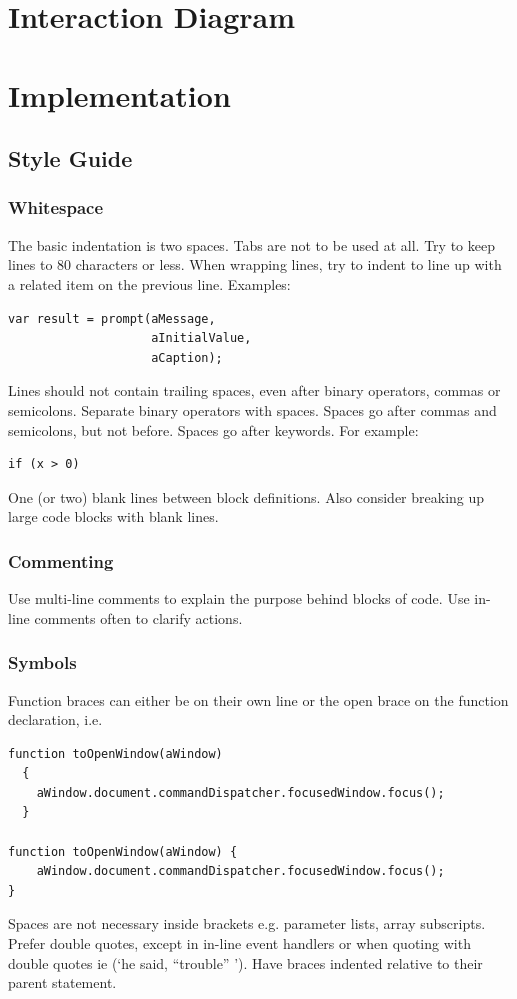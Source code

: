 \documentclass[letterpaper,12pt]{article}
\begin{document}
\section{Interaction Diagram}

\section{Implementation}
\subsection{Style Guide}
\subsubsection{Whitespace}
The basic indentation is two spaces. Tabs are not to be used at all.
Try to keep lines to 80 characters or less. When wrapping lines, try to indent to line up with a related item on the previous line. Examples: 
\begin{verbatim}
var result = prompt(aMessage,
                    aInitialValue,
                    aCaption);
\end{verbatim}
Lines should not contain trailing spaces, even after binary operators, commas or semicolons.
Separate binary operators with spaces.
Spaces go after commas and semicolons, but not before.
Spaces go after keywords. For example:
\begin{verbatim}
if (x > 0)
\end{verbatim}
One (or two) blank lines between block definitions. Also consider breaking up large code blocks with blank lines.

\subsubsection{Commenting}
Use multi-line comments to explain the purpose behind blocks of code.
Use in-line comments often to clarify actions.

\subsubsection{Symbols}
Function braces can either be on their own line or the open brace on the function declaration, i.e.

\begin{verbatim}
function toOpenWindow(aWindow)
  {
    aWindow.document.commandDispatcher.focusedWindow.focus();  
  }

function toOpenWindow(aWindow) {
    aWindow.document.commandDispatcher.focusedWindow.focus();  
}
\end{verbatim}
Spaces are not necessary inside brackets e.g. parameter lists, array subscripts.
Prefer double quotes, except in in-line event handlers or when quoting with double quotes ie (‘he said, “trouble” ’).
Have braces indented relative to their parent statement.
\end{document}
